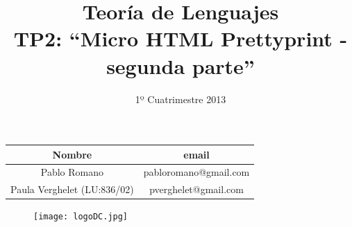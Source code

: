 \documentclass[a4paper,8pt]{article}
\title{Teoría de Lenguajes\\ \textbf{TP2: “Micro HTML Prettyprint - segunda parte”}}
\author{1º Cuatrimestre 2013}
\date{}
\begin{document}
\maketitle

\begin{center}
\vspace{10cm}

\begin{tabular}{|c|c|}
\hline
\hline
\textbf{Nombre}&\textbf{email}\\
\hline
\hline
Pablo Romano&pabloromano@gmail.com\\
\hline
Paula Verghelet (LU:836/02)&pverghelet@gmail.com\\
\hline
\hline
\end{tabular}
\begin{figure}[h!]
 \centering
 \texttt{[image: logoDC.jpg]}
\end{figure}
\end{center}
\end{document}
